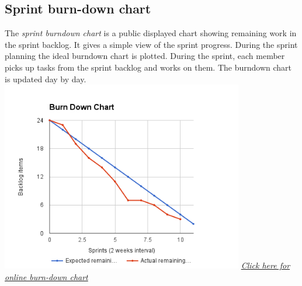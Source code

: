 \documentclass[hidelinks, 12pt, oneside]{article}
\begin{document}
 	\subsection{Sprint burn-down chart}
	The \emph{sprint burndown chart} is a public displayed chart showing remaining work in the sprint backlog. It gives a simple view of the sprint progress. During the sprint planning 
	the ideal burndown chart is plotted. During the sprint, each member picks up tasks from the sprint backlog and works on them. The burndown chart is updated day by day.\newline\newline
	\includegraphics[width=400px]{img/burndown.png}\newline
	\href{https://docs.google.com/spreadsheets/u/3/d/1Qa7quxQTuZJmRNlt84Dl4iSXsZh-cYIeFgFJ_hzmv5k/edit?usp=drive_web}{\emph{Click here for online burn-down chart}}\newpage
 	
\end{document}
